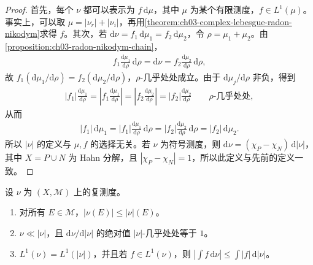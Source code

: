 \documentclass[../../main.tex]{subfiles}%
\begin{document}
\begin{proof}
首先，每个 $\nu$ 都可以表示为 $f\,\mathrm{d}\mu$，其中 $\mu$ 为某个有限测度，$f\in L^1(\mu)$。事实上，可以取 $\mu=|\nu_r|+|\nu_i|$，再用\cref{theorem:ch03-complex-lebesgue-radon-nikodym}求得 $f$。其次，若 $\mathrm{d}\nu=f_1\,\mathrm{d}\mu_1=f_2\,\mathrm{d}\mu_2$，令 $\rho=\mu_1+\mu_2$。由\cref{proposition:ch03-radon-nikodym-chain}，
\begin{align*}
f_1\frac{\mathrm{d}\mu_1}{\mathrm{d}\rho}\,\mathrm{d}\rho
=\mathrm{d}\nu
=f_2\frac{\mathrm{d}\mu_2}{\mathrm{d}\rho}\,\mathrm{d}\rho,
\end{align*}
故 $f_1(\mathrm{d}\mu_1/\mathrm{d}\rho)=f_2(\mathrm{d}\mu_2/\mathrm{d}\rho)$，$\rho$-几乎处处成立。由于 $\mathrm{d}\mu_j/\mathrm{d}\rho$ 非负，得到
\begin{align*}
|f_1|\frac{\mathrm{d}\mu_1}{\mathrm{d}\rho}
=\left|f_1\frac{\mathrm{d}\mu_1}{\mathrm{d}\rho}\right|
=\left|f_2\frac{\mathrm{d}\mu_2}{\mathrm{d}\rho}\right|
=|f_2|\frac{\mathrm{d}\mu_2}{\mathrm{d}\rho}
\qquad\rho\text{-几乎处处},
\end{align*}
从而
\begin{align*}
|f_1|\,\mathrm{d}\mu_1
=|f_1|\frac{\mathrm{d}\mu_1}{\mathrm{d}\rho}\,\mathrm{d}\rho
=|f_2|\frac{\mathrm{d}\mu_2}{\mathrm{d}\rho}\,\mathrm{d}\rho
=|f_2|\,\mathrm{d}\mu_2.
\end{align*}
所以 $|\nu|$ 的定义与 $\mu,f$ 的选择无关。若 $\nu$ 为符号测度，则 $\mathrm{d}\nu=(\chi_P-\chi_N)\,\mathrm{d}|\nu|$，其中 $X=P\cup N$ 为 Hahn 分解，且 $|\chi_P-\chi_N|=1$，所以此定义与先前的定义一致。
\end{proof}
\begin{proposition}\label{proposition:ch03-complex-variation-properties}
设 $\nu$ 为 $(X,\mathscr{M})$ 上的复测度。
\begin{enumerate}
\item\label{item:ch03-complex-variation-domination} 对所有 $E\in\mathscr{M}$，$|\nu(E)|\le|\nu|(E)$。
\item\label{item:ch03-complex-polar-density} $\nu\ll|\nu|$，且 $\mathrm{d}\nu/\mathrm{d}|\nu|$ 的绝对值 $|\nu|$-几乎处处等于 $1$。
\item\label{item:ch03-complex-integral-variation} $L^1(\nu)=L^1(|\nu|)$，并且若 $f\in L^1(\nu)$，则 $|\int f\,\mathrm{d}\nu|\le\int|f|\,\mathrm{d}|\nu|$。
\end{enumerate}
\end{proposition}
\end{document}

